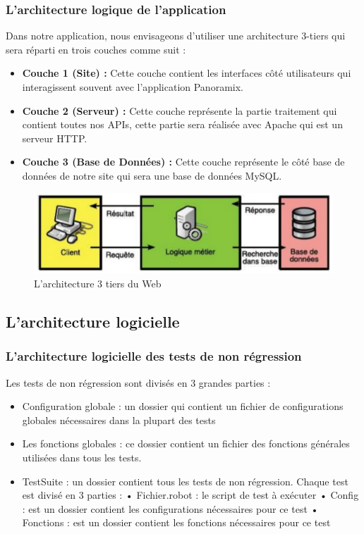 \subsubsection{L'architecture logique de l’application}
Dans notre application, nous envisageons d’utiliser une architecture 3-tiers qui sera réparti en trois couches comme suit :
\begin{itemize}
	\item\textbf{ Couche 1 (Site) :} Cette couche contient les interfaces côté utilisateurs qui interagissent souvent avec l’application Panoramix.
	\item\textbf{ Couche 2 (Serveur) : }Cette couche représente la partie traitement qui contient toutes nos APIs, cette partie sera réalisée avec Apache qui est un serveur HTTP.
	\item \textbf{Couche 3 (Base de Données) :} Cette couche représente le côté base de données de notre site qui sera une base de données MySQL.
\end{itemize}
\begin{figure}[H]
	\centering
	\includegraphics[width=0.7\linewidth]{img/architectures-3tiers-web}
	\caption[L'architectures 3 tiers du Web]{L'architecture 3 tiers du Web}
	\label{fig:architectures-3tiers-web}
\end{figure}

\subsection[L'architecture logicielle]{L'architecture logicielle}
\subsubsection{L'architecture logicielle des tests de non régression}
Les tests de non régression sont divisés en 3 grandes parties :
\begin{itemize}
	\item Configuration globale : un dossier qui contient un fichier de configurations globales nécessaires dans la plupart des tests
	\item Les fonctions globales : ce dossier contient un fichier des fonctions générales utilisées dans tous les tests.
	\item TestSuite :  un dossier contient tous les tests de non régression. Chaque test est divisé en 3 parties :
		\subitem • Fichier.robot : le script de test à exécuter
		\subitem • Config : est un dossier contient les configurations nécessaires pour ce test
		\subitem • Fonctions : est un dossier contient les fonctions nécessaires pour ce test
\end{itemize}
